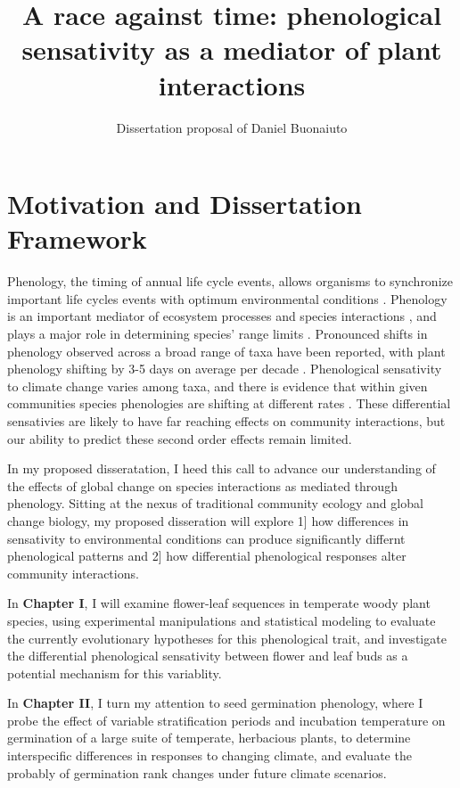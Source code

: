 \documentclass{article}\usepackage[]{graphicx}\usepackage[]{color}
\begin{document}
\title{A race against time: phenological sensativity as a mediator of plant interactions}
\author{Dissertation proposal of Daniel Buonaiuto}
\maketitle{}
\section*{Motivation and Dissertation Framework}
\indent\indent Phenology, the timing of annual life cycle events, allows organisms to synchronize important life cycles events with optimum environmental conditions \citep{Forrest2010}. Phenology is an important mediator of ecosystem processes \citep*{Pia02007,Cleland2007} and species interactions \citep*{Yang2010,Leverett2017}, and plays a major role in determining species' range limits \citep{Chuine2001}. Pronounced shifts in phenology observed across a broad range of taxa have been reported, with plant phenology shifting by 3-5 days on average per decade \citep*{Parmesian2003,Menzel2006,Root2003}. Phenological sensativity to climate change varies among taxa, and there is evidence that within given communities species phenologies are shifting at different rates \citep*{Cleland2012,Ovaskainen2013}. These differential sensativies are likely to have far reaching effects on community interactions, but our ability to predict these second order effects remain limited.
\par In my proposed disseratation, I heed this call to advance our understanding of the effects of global change on species interactions as mediated through phenology. Sitting at the nexus of traditional community ecology and global change biology, my proposed disseration will explore 1] how differences in sensativity to environmental conditions can produce significantly differnt phenological patterns and 2] how differential phenological responses alter community interactions.
\par In \textbf{Chapter I}, I will examine flower-leaf sequences in temperate woody plant species, using experimental manipulations and statistical modeling to evaluate the currently evolutionary hypotheses for this phenological trait, and investigate the differential phenological sensativity between flower and leaf buds as a potential mechanism for this variablity.
\par In \textbf{Chapter II}, I turn my attention to seed germination phenology, where I probe the effect of variable stratification periods and incubation temperature on germination of a large suite of temperate, herbacious plants, to determine interspecific differences in responses to changing climate, and evaluate the probably of germination rank changes under future climate scenarios.
\end{document}
